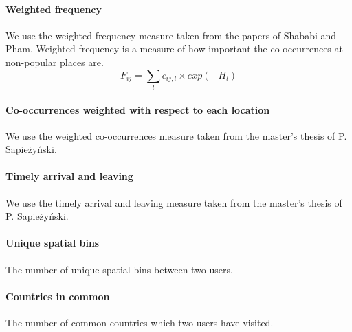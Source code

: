 \paragraph{Weighted frequency}
We use the weighted frequency measure taken from the papers of Shababi and Pham\cite{iRWRfSD}\cite{AEBMtISSfSD}.
Weighted frequency is a measure of how important the co-occurrences at non-popular places are.
$$
F_{ij}=\sum\limits_{l}c_{ij,l} \times exp(-H_l)
$$

\paragraph{Co-occurrences weighted with respect to each location}
We use the weighted co-occurrences measure taken from the master's thesis of P. Sapieżyński\cite{IMM2013-06556}.

\paragraph{Timely arrival and leaving}
We use the timely arrival and leaving measure taken from the master's thesis of P. Sapieżyński\cite{IMM2013-06556}.

\paragraph{Unique spatial bins}
The number of unique spatial bins between two users.

\paragraph{Countries in common}
The number of common countries which two users have visited.